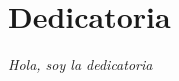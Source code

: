\chapter*{Dedicatoria}
\thispagestyle{empty}

\vspace*{1cm}

\begin{center}
    \itshape
    Hola, soy la dedicatoria
    \medskip


    \medskip


    \medskip


    \vspace{1cm}
    
\end{center}